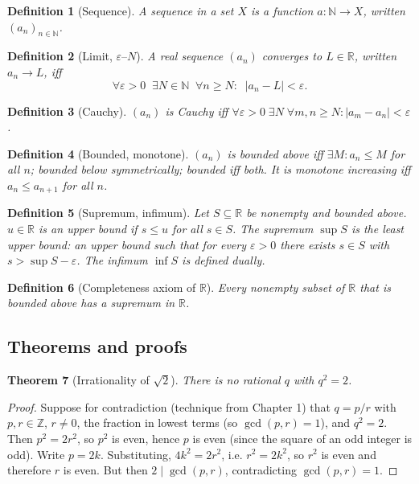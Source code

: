 \documentclass[11pt]{article}
\newtheorem{theorem}{Theorem}[section]
\newtheorem{definition}[theorem]{Definition}
\theoremstyle{remark}
\begin{document}
\begin{definition}[Sequence]
A \emph{sequence} in a set $X$ is a function $a : \mathbb{N} \to X$, written $(a_n)_{n \in \mathbb{N}}$.
\end{definition}

\begin{definition}[Limit, $\varepsilon$--$N$]
A real sequence $(a_n)$ \emph{converges} to $L \in \mathbb{R}$, written $a_n \to L$, iff
\[
\forall \varepsilon > 0 \;\; \exists N \in \mathbb{N} \;\; \forall n \geq N : \;\; |a_n - L| < \varepsilon.
\]
\end{definition}

\begin{definition}[Cauchy]
$(a_n)$ is \emph{Cauchy} iff $\forall \varepsilon > 0\; \exists N\; \forall m, n \geq N : |a_m - a_n| < \varepsilon$.
\end{definition}

\begin{definition}[Bounded, monotone]
$(a_n)$ is \emph{bounded above} iff $\exists M : a_n \leq M$ for all $n$; bounded below symmetrically; \emph{bounded} iff both. It is \emph{monotone increasing} iff $a_n \leq a_{n+1}$ for all $n$.
\end{definition}

\begin{definition}[Supremum, infimum]
Let $S \subseteq \mathbb{R}$ be nonempty and bounded above. $u \in \mathbb{R}$ is an \emph{upper bound} if $s \leq u$ for all $s \in S$. The \emph{supremum} $\sup S$ is the least upper bound: an upper bound such that for every $\varepsilon > 0$ there exists $s \in S$ with $s > \sup S - \varepsilon$. The \emph{infimum} $\inf S$ is defined dually.
\end{definition}

\begin{definition}[Completeness axiom of $\mathbb{R}$]
Every nonempty subset of $\mathbb{R}$ that is bounded above has a supremum in $\mathbb{R}$.
\end{definition}

\subsection*{Theorems and proofs}

\begin{theorem}[Irrationality of $\sqrt{2}$]
There is no rational $q$ with $q^2 = 2$.
\end{theorem}

\begin{proof}
Suppose for contradiction (technique from Chapter 1) that $q = p/r$ with $p, r \in \mathbb{Z}$, $r \neq 0$, the fraction in lowest terms (so $\gcd(p, r) = 1$), and $q^2 = 2$. Then $p^2 = 2 r^2$, so $p^2$ is even, hence $p$ is even (since the square of an odd integer is odd). Write $p = 2k$. Substituting, $4 k^2 = 2 r^2$, i.e. $r^2 = 2 k^2$, so $r^2$ is even and therefore $r$ is even. But then $2 \mid \gcd(p, r)$, contradicting $\gcd(p, r) = 1$.
\end{proof}
\end{document}
